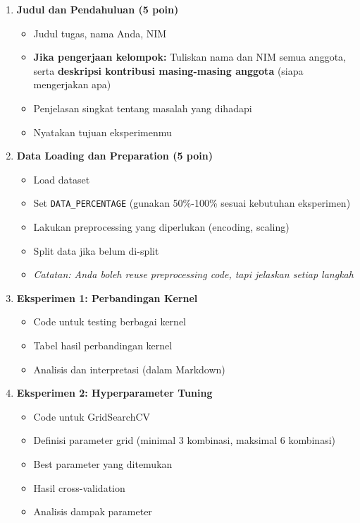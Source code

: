 \documentclass[12pt,a4paper]{article}
\begin{document}
\begin{enumerate}[label=\textbf{\arabic*.}]
    \item \textbf{Judul dan Pendahuluan (5 poin)}
    \begin{itemize}
        \item Judul tugas, nama Anda, NIM
        \item \textbf{Jika pengerjaan kelompok:} Tuliskan nama dan NIM semua anggota, serta \textbf{deskripsi kontribusi masing-masing anggota} (siapa mengerjakan apa)
        \item Penjelasan singkat tentang masalah yang dihadapi
        \item Nyatakan tujuan eksperimenmu
    \end{itemize}
    
    \item \textbf{Data Loading dan Preparation (5 poin)}
    \begin{itemize}
        \item Load dataset
        \item Set \texttt{DATA\_PERCENTAGE} (gunakan 50\%-100\% sesuai kebutuhan eksperimen)
        \item Lakukan preprocessing yang diperlukan (encoding, scaling)
        \item Split data jika belum di-split
        \item \textit{Catatan: Anda boleh reuse preprocessing code, tapi jelaskan setiap langkah}
    \end{itemize}
    
    \item \textbf{Eksperimen 1: Perbandingan Kernel}
    \begin{itemize}
        \item Code untuk testing berbagai kernel
        \item Tabel hasil perbandingan kernel
        \item Analisis dan interpretasi (dalam Markdown)
    \end{itemize}
    
    \item \textbf{Eksperimen 2: Hyperparameter Tuning}
    \begin{itemize}
        \item Code untuk GridSearchCV
        \item Definisi parameter grid (minimal 3 kombinasi, maksimal 6 kombinasi)
        \item Best parameter yang ditemukan
        \item Hasil cross-validation
        \item Analisis dampak parameter
    \end{itemize}
    

\end{enumerate}
\end{document}
